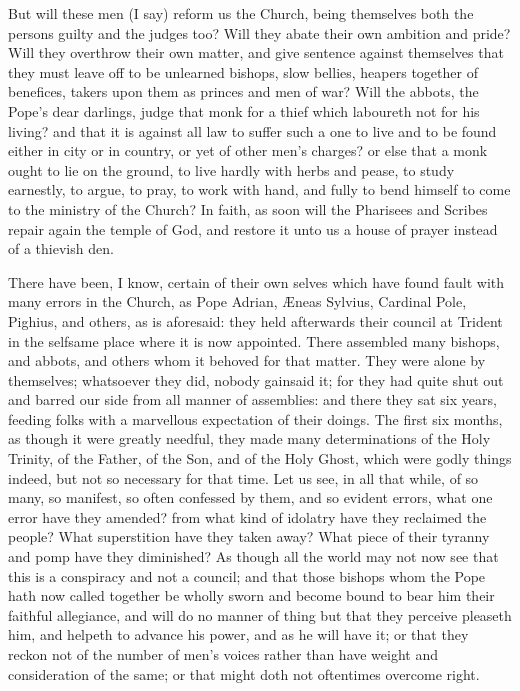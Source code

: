 But will these men (I say) reform us the Church, being themselves
both the persons guilty and the judges too? Will they abate their
own ambition and pride? Will they overthrow their own matter,
and give sentence against themselves that they must leave off to be
unlearned bishops, slow bellies, heapers together of benefices, takers
upon them as princes and men of war? Will the abbots, the Pope’s
dear darlings, judge that monk for a thief which laboureth not for his
living? and that it is against all law to suffer such a one to live
and to be found either in city or in country, or yet of other men’s
charges? or else that a monk ought to lie on the ground, to live hardly
with herbs and pease, to study earnestly, to argue, to pray, to work
with hand, and fully to bend himself to come to the ministry of the
Church? In faith, as soon will the Pharisees and Scribes repair
again the temple of God, and restore it unto us a house of prayer instead
of a thievish den.

There
have been, I know, certain of their own selves which have found fault
with many errors in the Church, as Pope Adrian, Æneas Sylvius,
Cardinal Pole, Pighius, and others, as is aforesaid: they held afterwards
their council at Trident in the selfsame place where it is now appointed.
There assembled many bishops, and abbots, and others whom it behoved
for that matter. They were alone by themselves; whatsoever they
did, nobody gainsaid it; for they had quite shut out and barred our
side from all manner of assemblies: and there they sat six years, feeding
folks with a marvellous expectation of their doings. The first
six months, as though it were greatly needful, they made many determinations
of the Holy Trinity, of the Father, of the Son, and of the Holy Ghost,
which were godly things indeed, but not so necessary for that time.
Let us see, in all that while, of so many, so manifest, so often confessed
by them, and so evident errors, what one error have they amended? from
what kind of idolatry have they reclaimed the people? What superstition
have they taken away? What piece of their tyranny and pomp have
they diminished? As though all the world may not now see that
this is a conspiracy and not a council; and that those bishops
whom the Pope hath now called together be wholly sworn and become bound
to bear him their faithful allegiance, and will do no manner of thing
but that they perceive pleaseth him, and helpeth to advance his power,
and as he will have it; or that they reckon not of the number of men’s
voices rather than have weight and consideration of the same; or that
might doth not oftentimes overcome right.

